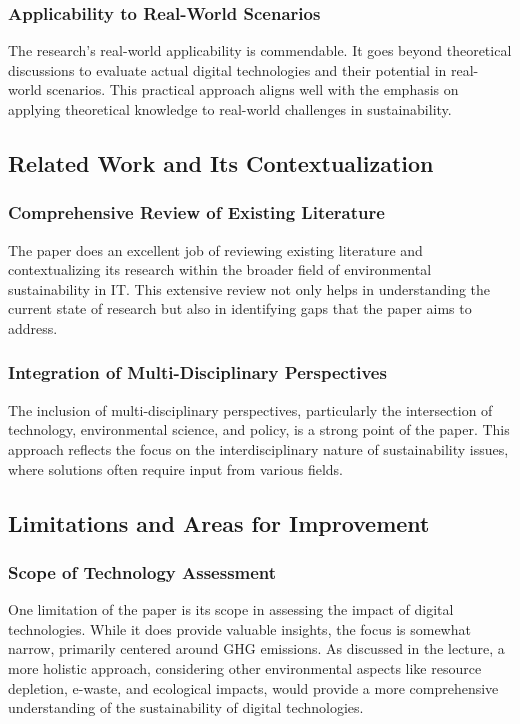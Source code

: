 \documentclass[conference,compsoc]{IEEEtran}
\begin{document}
\subsubsection{Applicability to Real-World Scenarios}

The research's real-world applicability is commendable. It goes beyond theoretical discussions to evaluate actual digital technologies and their potential in real-world scenarios. This practical approach aligns well with the  emphasis on applying theoretical knowledge to real-world challenges in sustainability.

\subsection{Related Work and Its Contextualization}

\subsubsection{Comprehensive Review of Existing Literature}

The paper does an excellent job of reviewing existing literature and contextualizing its research within the broader field of environmental sustainability in IT. This extensive review not only helps in understanding the current state of research but also in identifying gaps that the paper aims to address.

\subsubsection{Integration of Multi-Disciplinary Perspectives}

The inclusion of multi-disciplinary perspectives, particularly the intersection of technology, environmental science, and policy, is a strong point of the paper. This approach reflects the  focus on the interdisciplinary nature of sustainability issues, where solutions often require input from various fields.

\subsection{Limitations and Areas for Improvement}

\subsubsection{Scope of Technology Assessment}

One limitation of the paper is its scope in assessing the impact of digital technologies. While it does provide valuable insights, the focus is somewhat narrow, primarily centered around GHG emissions. As discussed in the lecture, a more holistic approach, considering other environmental aspects like resource depletion, e-waste, and ecological impacts, would provide a more comprehensive understanding of the sustainability of digital technologies.
\end{document}
